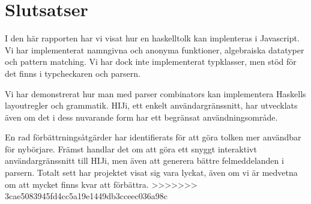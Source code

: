 \section{Slutsatser}
I den här rapporten har vi visat hur en haskelltolk kan implenteras i Javascript.
Vi har implementerat namngivna och anonyma funktioner, algebraiska datatyper och pattern matching. 
Vi har dock inte implementerat typklasser, men stöd för det finns i typcheckaren och parsern. 

Vi har demonstrerat hur man med parser combinators kan implementera Haskells layoutregler och grammatik. HIJi, ett enkelt användargränssnitt, har utvecklats även om det i dess nuvarande form har ett begränsat användningsområde.

En rad förbättrningsåtgärder har identifierats för att göra tolken mer användbar för nybörjare. Främst handlar det om att göra ett snyggt interaktivt användargränssnitt till HIJi, men även att generera bättre felmeddelanden i parsern. 
Totalt sett har projektet visat sig vara lyckat, även om vi är medvetna om att mycket finns kvar att förbättra.
>>>>>>> 3cae5083945fd4cc5a19e1449db3cceec036a98c
